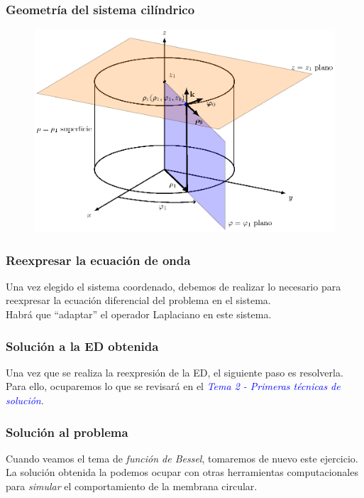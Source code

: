 \documentclass[12pt]{beamer}
\begin{document}
\begin{frame}
\frametitle{Geometría del sistema cilíndrico}
\begin{figure}[H]
  \centering
  \includegraphics[scale=0.7]{Imagenes/Coordenadas_Cilindricas_01.eps}
\end{figure}
\end{frame}
\begin{frame}
\frametitle{Reexpresar la ecuación de onda}
Una vez elegido el sistema coordenado, debemos de realizar lo necesario para reexpresar la ecuación diferencial del problema en el sistema.
\\
\bigskip
\pause
Habrá que \enquote{adaptar} el operador Laplaciano en este sistema.
\end{frame}
\begin{frame}
\frametitle{Solución a la ED obtenida}
Una vez que se realiza la reexpresión de la ED, el siguiente paso es resolverla.
\\
\bigskip
\pause
Para ello, ocuparemos lo que se revisará en el \emph{\textcolor{blue}{Tema 2 - Primeras técnicas de solución}}.
\end{frame}
\begin{frame}
\frametitle{Solución al problema}
Cuando veamos el tema de \emph{función de Bessel}, tomaremos de nuevo este ejercicio.
\\
\bigskip
\pause
La solución obtenida la podemos ocupar con otras herramientas computacionales para \emph{simular} el comportamiento de la membrana circular.
\end{frame}
\end{document}
